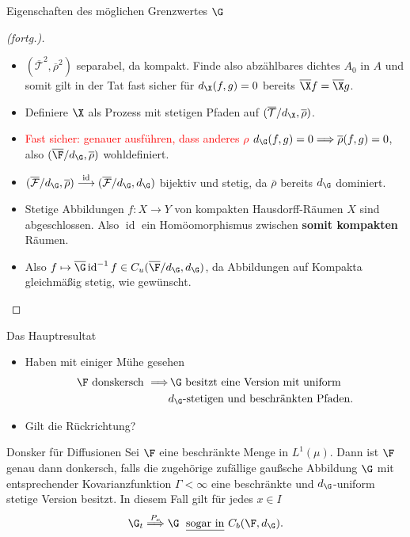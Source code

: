 \begin{frame}{Eigenschaften des möglichen Grenzwertes $\G$}
  \begin{proof}[\proofname (fortg.)]
  \begin{itemize}
      \item $(\overline{\mathcal{T}}^2, \overline{\rho}^2)$ separabel, da kompakt. Finde also abzählbares dichtes $A_0$ in $A$ und somit gilt in der Tat fast sicher für $d_\X(f,g) = 0$ bereits $\overline{\X}f = \overline{\X}g$. 
      \item Definiere $\X$ als Prozess mit stetigen Pfaden auf $(\overline{\mathcal{T}}/d_\X, \overline{\rho})$. 
      \item \textcolor{red}{Fast sicher: genauer ausführen, dass anderes $\rho$} $d_\G(f,g) = 0 \Longrightarrow \overline{\rho}(f,g) = 0$, also $(\overline{\F}/d_\G, \overline{\rho})$ wohldefiniert.
      \pause
      \item $(\overline{\mathcal{F}}/d_\G, \overline{\rho}) \overset{\operatorname{id}}{\longrightarrow} (\overline{\mathcal{F}}/d_\G, d_\G)$ bijektiv und stetig, da $\overline{\rho}$ bereits $d_\G$ dominiert.
      \item Stetige Abbildungen $f: X \to Y$ von kompakten Hausdorff-Räumen $X$ sind abgeschlossen. Also $\operatorname{id}$ ein Homöomorphismus zwischen \textbf{somit kompakten} Räumen. 
      \pause
      \item Also $f \mapsto \overline{\G}\operatorname{id}^{-1}f \in C_u(\overline{\F}/d_\G, d_\G)$, da Abbildungen auf Kompakta gleichmäßig stetig, wie gewünscht. 
  \end{itemize}\end{proof}
\end{frame}

\begin{frame}{Das Hauptresultat}
    \begin{itemize}
        \item Haben mit einiger Mühe gesehen \begin{align*} \F \text{ donskersch }\Longrightarrow & \,\G \text{ besitzt eine Version mit uniform } \\ &d_\G\text{-stetigen und beschränkten Pfaden.}\end{align*}
        \item Gilt die Rückrichtung?
            \pause
    \end{itemize}
    \begin{theoremblockname}{Donsker für Diffusionen}
        Sei $\F$ eine beschränkte Menge in $L^1(\mu)$. Dann ist $\F$ genau dann donkersch, falls die zugehörige zufällige gaußsche Abbildung $\G$ mit entsprechender Kovarianzfunktion $\Gamma  < \infty$ eine beschränkte und $d_\G$-uniform stetige Version besitzt. In diesem Fall gilt für jedes $x \in I$ \[
\G_t \overset{P_x}{\Longrightarrow} \G \; \text{ \underline{sogar in} } C_b(\F, d_\G). 
        \]
    \end{theoremblockname}
\end{frame}

